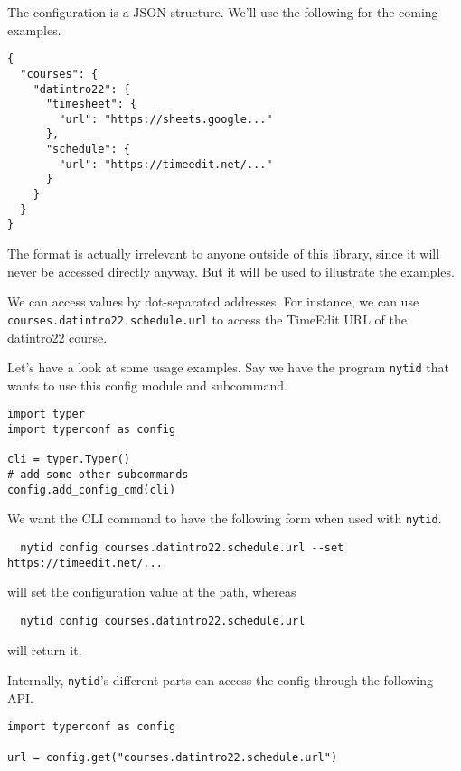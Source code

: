 The configuration is a JSON structure.
We'll use the following for the coming examples.
\label{ConfigStructure}
\begin{verbatim}
{
  "courses": {
    "datintro22": {
      "timesheet": {
        "url": "https://sheets.google..."
      },
      "schedule": {
        "url": "https://timeedit.net/..."
      }
    }
  }
}
\end{verbatim}
The format is actually irrelevant to anyone outside of this library, since it 
will never be accessed directly anyway.
But it will be used to illustrate the examples.

We can access values by dot-separated addresses.
For instance, we can use \texttt{courses.datintro22.schedule.url} to access the 
TimeEdit URL of the datintro22 course.

Let's have a look at some usage examples.
Say we have the program \texttt{nytid} that wants to use this config module and 
subcommand.
\begin{verbatim}
import typer
import typerconf as config

cli = typer.Typer()
# add some other subcommands
config.add_config_cmd(cli)
\end{verbatim}

We want the CLI command to have the following form when used with \texttt{nytid}.
\begin{verbatim}
  nytid config courses.datintro22.schedule.url --set https://timeedit.net/...
\end{verbatim}
will set the configuration value at the path, whereas
\begin{verbatim}
  nytid config courses.datintro22.schedule.url
\end{verbatim}
will return it.

Internally, \texttt{nytid}'s different parts can access the config through the 
following API.
\begin{verbatim}
import typerconf as config

url = config.get("courses.datintro22.schedule.url")
\end{verbatim}

